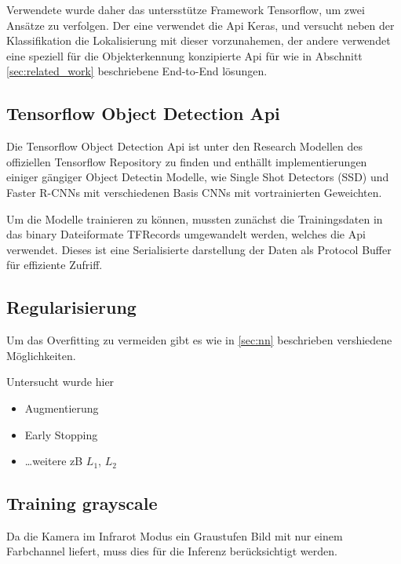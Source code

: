 Verwendete wurde daher das untersstütze Framework Tensorflow, 
um zwei Ansätze zu verfolgen. Der eine verwendet die Api Keras, 
und versucht neben der Klassifikation die Lokalisierung mit 
dieser vorzunahemen, der andere verwendet eine speziell für die 
Objekterkennung konzipierte Api für wie in Abschnitt
 \ref{sec:related_work} beschriebene End-to-End lösungen.

\subsection{Tensorflow Object Detection Api}

Die Tensorflow Object Detection Api ist unter den Research Modellen
\cite{HttpsGithubCom} des offiziellen Tensorflow Repository zu
finden und enthällt implementierungen einiger gängiger Object Detectin
Modelle, wie Single Shot Detectors (SSD) und Faster R-CNNs mit 
verschiedenen Basis CNNs mit vortrainierten Geweichten.

Um die Modelle trainieren zu können, mussten zunächst die 
Trainingsdaten in das binary Dateiformate TFRecords umgewandelt 
werden, welches die Api verwendet. Dieses ist eine Serialisierte 
darstellung der Daten als Protocol Buffer für effiziente Zufriff.



\subsection{Regularisierung}

Um das Overfitting zu vermeiden gibt es wie in \ref{sec:nn} 
beschrieben vershiedene Möglichkeiten.

Untersucht wurde hier

\begin{itemize}
    \item Augmentierung
    \item Early Stopping
    \item \dots weitere zB $L_{1}$, $L_{2}$
\end{itemize}



\subsection{Training grayscale}\label{subsec:train_gray}

Da die Kamera im Infrarot Modus ein Graustufen Bild mit nur einem 
Farbchannel liefert, muss dies für die Inferenz berücksichtigt werden.

